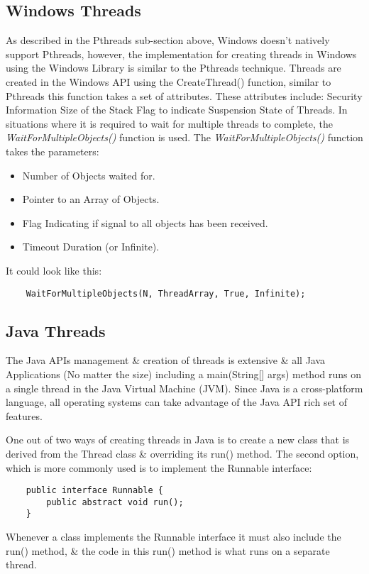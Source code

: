 \documentclass[a4paper,11pt]{article}
\begin{document}
\subsection{Windows Threads}
As described in the Pthreads sub-section above, Windows doesn't natively support Pthreads, however, the implementation for creating threads in Windows using the Windows Library is similar to the Pthreads technique.\cite{Operatingsystemconcepts}
\newline\indent Threads are created in the Windows API using the CreateThread() function, similar to Pthreads this function takes a set of attributes. These attributes include:
Security Information
Size of the Stack
Flag to indicate Suspension State of Threads.
In situations where it is required to wait for multiple threads to complete, the \emph{WaitForMultipleObjects()} function is used.\cite{Operatingsystemconcepts} The \emph{WaitForMultipleObjects()} function takes the parameters:
\begin{itemize}
    \item Number of Objects waited for.
    \item Pointer to an Array of Objects.
    \item Flag Indicating if signal to all objects has been received.
    \item Timeout Duration (or Infinite). 
\end{itemize}
It could look like this:
\begin{verbatim}
    WaitForMultipleObjects(N, ThreadArray, True, Infinite);
\end{verbatim}
\subsection{Java Threads}
The Java APIs management \& creation of threads is extensive \& all Java Applications (No matter the size) including a main(String[] args) method runs on a single thread in the Java Virtual Machine (JVM). Since Java is a cross-platform language, all operating systems can take advantage of the Java API rich set of features.\cite{Operatingsystemconcepts}

\noindent One out of two ways of creating threads in Java is to create a new class that is derived from the Thread class \& overriding its run() method. The second option, which is more commonly used is to implement the Runnable interface:
\begin{verbatim}
    public interface Runnable {
        public abstract void run();
    }
\end{verbatim}
Whenever a class implements the Runnable interface it must also include the run() method, \& the code in this run() method is what runs on a separate thread.\cite{Operatingsystemconcepts}
\end{document}
